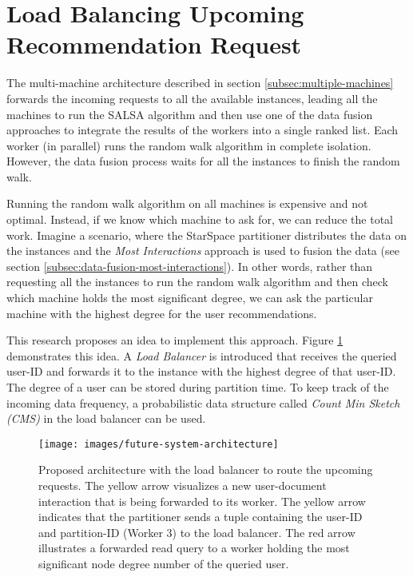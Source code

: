 \section{Load Balancing Upcoming Recommendation Request}
\label{sec:load-balancing}
The multi-machine architecture described in section \ref{subsec:multiple-machines} forwards the incoming requests to all the available instances, leading all the machines to run the SALSA algorithm and then use one of the data fusion approaches to integrate the results of the workers into a single ranked list. Each worker (in parallel) runs the random walk algorithm in complete isolation. However, the data fusion process waits for all the instances to finish the random walk. 


Running the random walk algorithm on all machines is expensive and not optimal. Instead, if we know which machine to ask for, we can reduce the total work. Imagine a scenario, where the StarSpace partitioner distributes the data on the instances and the \emph{Most Interactions} approach is used to fusion the data (see section \ref{subsec:data-fusion-most-interactions}). In other words, rather than requesting all the instances to run the random walk algorithm and then check which machine holds the most significant degree, we can ask the particular machine with the highest degree for the user recommendations.

This research proposes an idea to implement this approach. Figure \ref{fig:loadbalancer} demonstrates this idea. A \emph{Load Balancer} is introduced that receives the queried user-ID and forwards it to the instance with the highest degree of that user-ID. The degree of a user can be stored during partition time. To keep track of the incoming data frequency, a probabilistic data structure called \emph{Count Min Sketch (CMS)} \cite{cormodeImprovedDataStream2005} in the load balancer can be used.


\begin{figure}[!ht]
    \centering
    \texttt{[image: images/future-system-architecture]}
    \caption{Proposed architecture with the load balancer to route the upcoming requests. The yellow arrow visualizes a new user-document interaction that is being forwarded to its worker. The yellow arrow indicates that the partitioner sends a tuple containing the user-ID and partition-ID (Worker 3) to the load balancer. The red arrow illustrates a forwarded read query to a worker holding the most significant node degree number of the queried user.}
    \label{fig:loadbalancer}
\end{figure}


